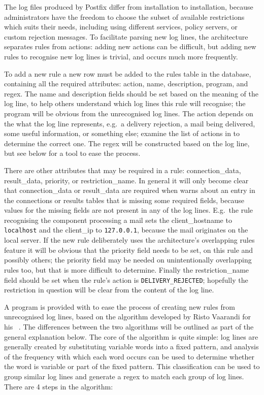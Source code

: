 The log files produced by Postfix differ from installation to installation,
because administrators have the freedom to choose the subset of available
restrictions which suits their needs, including using different
 services, policy servers, or custom rejection messages.  To
facilitate parsing new log lines, the architecture separates rules from
actions: adding new actions can be difficult, but adding new rules to
recognise new log lines is trivial, and occurs much more frequently.

To add a new rule a new row must be added to the rules table in the
database, containing all the required attributes: action, name,
description, program, and regex.  The name and description fields should be
set based on the meaning of the log line, to help others understand which
log lines this rule will recognise; the program will be obvious from the
unrecognised log lines.  The action depends on the what the log line
represents, e.g.\ a delivery rejection, a mail being delivered, some useful
information, or something else; examine the list of actions in
 to determine the correct
one.  The regex will be constructed based on the log line, but see below
for a tool to ease the process.

There are other attributes that may be required in a rule:
connection\_data, result\_data, priority, or restriction\_name.  In general
it will only become clear that connection\_data or result\_data are
required when \parsername{} warns about an entry in the connections or
results tables that is missing some required fields, because values for the
missing fields are not present in any of the log lines.  E.g.\ the rule
recognising the  component processing a mail sets the
client\_hostname to \texttt{localhost} and the client\_ip to
\texttt{127.0.0.1}, because the mail originates on the local server.  If
the new rule deliberately uses the architecture's overlapping rules feature
it will be obvious that the priority field needs to be set, on this rule and
possibly others; the priority field may be needed on unintentionally
overlapping rules too, but that is more difficult to determine.  Finally
the restriction\_name field should be set when the rule's action is
\texttt{DELIVERY\_REJECTED}; hopefully the restriction in question will be
clear from the content of the log line.

A program is provided with \parsername{} to ease the process of creating
new rules from unrecognised log lines, based on the algorithm developed by
Risto Vaarandi for his ~\cite{slct-paper}.  The differences
between the two algorithms will be outlined as part of the general
explanation below.  The core of the  algorithm is quite
simple: log lines are generally created by substituting variable words into
a fixed pattern, and analysis of the frequency with which each word occurs
can be used to determine whether the word is variable or part of the fixed
pattern.  This classification can be used to group similar log lines and
generate a regex to match each group of log lines.  There are 4 steps in
the algorithm:

